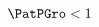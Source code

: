 \begin{equation}\begin{gathered}\begin{aligned}
  \PatPGro &  < 1   \label{eq:PFGIC}
\end{aligned}\end{gathered}\end{equation}
